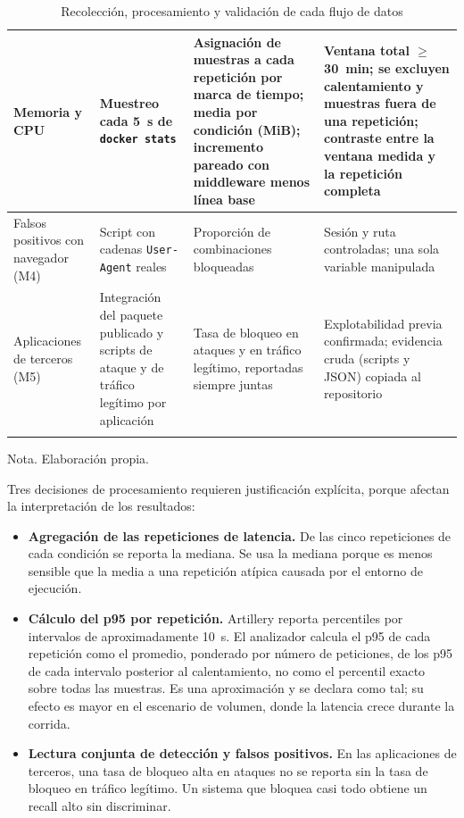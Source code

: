 \begin{longtable}{|L{2.3cm}|L{3.4cm}|L{3.4cm}|L{3.7cm}|}
Memoria y CPU & Muestreo cada 5~s de \texttt{docker stats} & Asignación de muestras a cada
repetición por marca de tiempo; media por condición (MiB); incremento pareado con middleware menos línea
base & Ventana total $\geq$30~min; se excluyen calentamiento y muestras fuera de una repetición;
contraste entre la ventana medida y la repetición completa \\ \hline
Falsos positivos con navegador (M4) & Script con cadenas \texttt{User-Agent} reales &
Proporción de combinaciones bloqueadas & Sesión y ruta controladas; una sola variable manipulada \\ \hline
Aplicaciones de terceros (M5) & Integración del paquete publicado y scripts de ataque y de
tráfico legítimo por aplicación & Tasa de bloqueo en ataques y en tráfico legítimo, reportadas
siempre juntas & Explotabilidad previa confirmada; evidencia cruda (scripts y JSON) copiada al
repositorio \\ \hline
\caption[Recolección, procesamiento y validación de datos]{Recolección, procesamiento y validación de cada flujo de datos}
\label{tab:met-datos}
\end{longtable}
{\footnotesize Nota. Elaboración propia.}

Tres decisiones de procesamiento requieren justificación explícita, porque afectan la
interpretación de los resultados:

\begin{itemize}
    \item \textbf{Agregación de las repeticiones de latencia.} De las cinco repeticiones de cada condición se reporta la mediana. Se usa la mediana porque es menos sensible que la media a una repetición atípica
    causada por el entorno de ejecución.
    \item \textbf{Cálculo del p95 por repetición.} Artillery reporta percentiles por intervalos
    de aproximadamente 10~s. El analizador calcula el p95 de cada repetición como el promedio,
    ponderado por número de peticiones, de los p95 de cada intervalo posterior al calentamiento,
    no como el percentil exacto sobre todas las muestras. Es una aproximación y se declara como
    tal; su efecto es mayor en el escenario de volumen, donde la latencia crece durante la corrida.
    \item \textbf{Lectura conjunta de detección y falsos positivos.} En las aplicaciones de
    terceros, una tasa de bloqueo alta en ataques no se reporta sin la tasa de bloqueo en tráfico
    legítimo. Un sistema que bloquea casi todo obtiene un recall alto sin discriminar.
\end{itemize}


